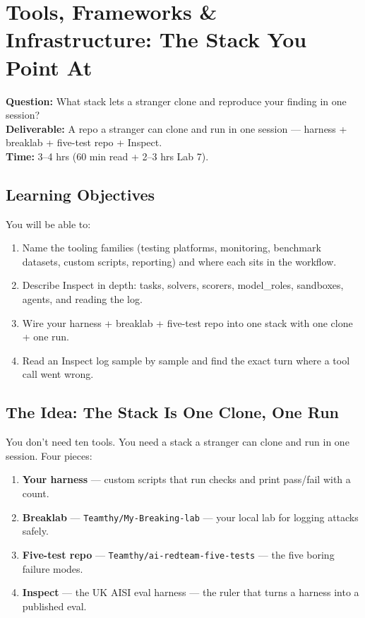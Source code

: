 \chapter{Tools, Frameworks \& Infrastructure: The Stack You Point At}
\label{ch:7}

\begin{tcolorbox}[colback=white,colframe=checkblack,title=Chapter 7 at a Glance,fonttitle=\bfseries,sharp corners,boxrule=1pt]
\textbf{Question:} What stack lets a stranger clone and reproduce your finding in one session?\\
\textbf{Deliverable:} A repo a stranger can clone and run in one session — harness + breaklab + five-test repo + Inspect.\\
\textbf{Time:} 3–4 hrs (60 min read + 2–3 hrs Lab 7).
\end{tcolorbox}

\section{Learning Objectives}
\fbadge
You will be able to:
\begin{enumerate}
\item Name the tooling families (testing platforms, monitoring, benchmark datasets, custom scripts, reporting) and where each sits in the workflow.
\item Describe Inspect in depth: tasks, solvers, scorers, model\_roles, sandboxes, agents, and reading the log.
\item Wire your harness + breaklab + five-test repo into one stack with one clone + one run.
\item Read an Inspect log sample by sample and find the exact turn where a tool call went wrong.
\end{enumerate}

\section{The Idea: The Stack Is One Clone, One Run}
\tierF

You don't need ten tools. You need a stack a stranger can clone and run in one session. Four pieces:

\begin{enumerate}
\item \textbf{Your harness} — custom scripts that run checks and print pass/fail with a count.
\item \textbf{Breaklab} — \texttt{Teamthy/My-Breaking-lab} — your local lab for logging attacks safely.
\item \textbf{Five-test repo} — \texttt{Teamthy/ai-redteam-five-tests} — the five boring failure modes.
\item \textbf{Inspect} — the UK AISI eval harness — the ruler that turns a harness into a published eval.
\end{enumerate}

